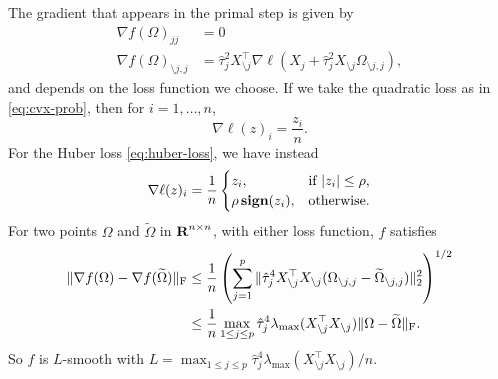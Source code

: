 \documentclass{article}
\begin{document}
The gradient that appears in the primal step is given by
\[
    \begin{aligned}
        \nabla f(\Omega)_{jj} &= 0 \\
        \nabla f(\Omega)_{\setminus j, j} &= \hat \tau_j^2 X_{\setminus j}^\top \nabla \ell(X_{j} + \hat\tau_j^2 X_{\setminus j} \Omega_{\setminus j, j}),
    \end{aligned}
\]
and depends on the loss function we choose. If we take the quadratic loss as in
\eqref{eq:cvx-prob}, then for $i=1, \dots, n$, 
\[
    \nabla \ell(z)_i = \frac{z_i}{n}.
\]
For the Huber loss \eqref{eq:huber-loss}, we have instead 
\[
    \nabla \ell(z)_i = \frac{1}{n} \begin{cases}
        z_i, & \text{if } |z_i| \leq \rho,\\
        \rho \mathop{\bf sign}(z_i), & \text{otherwise}.
    \end{cases}
\]
For two points $\Omega$ and $\widetilde{\Omega}$ in ${\mbox{\bf R}}^{n\times n}$, with either
loss function, $f$ satisfies
\[
    \begin{aligned}
        \| \nabla f(\Omega) - \nabla f(\widetilde{\Omega})\|_{\rm F} 
    & \leq \frac{1}{n} \left(\sum_{j=1}^{p} \|\hat\tau_j^4 X_{\setminus j}^\top X_{\setminus j}(\Omega_{\setminus j, j} - \widetilde{\Omega}_{\setminus j, j})\|_2^2\right)^{1/2} \\
                                                        &\leq \frac{1}{n} \max_{1\leq j\leq p} \hat\tau_j^4 \lambda_\text{max}(X_{\setminus j}^\top X_{\setminus j}) \|\Omega - \widetilde{\Omega}\|_{\rm F}. 
    \end{aligned}
\]
So $f$ is $L$-smooth with $L = \max_{1\leq j\leq p} \hat\tau_j^4 \lambda_\text{max}(X_{\setminus j}^\top X_{\setminus j}) / n$.
\end{document}
